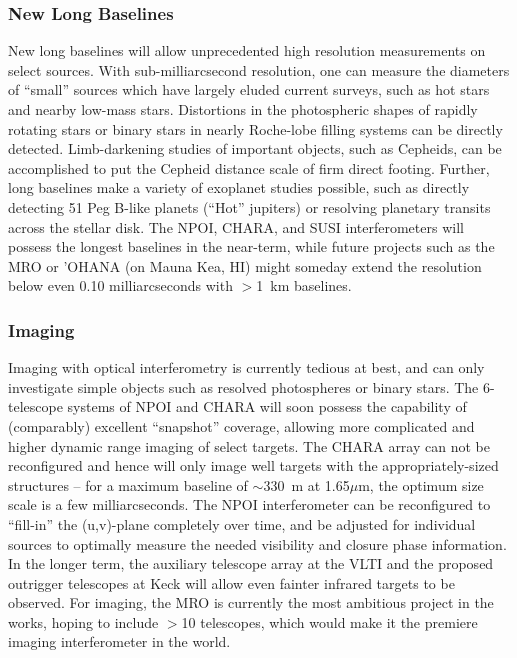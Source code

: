 \documentclass[12pt]{article}
\begin{document}
\subsubsection{New Long Baselines}
New long baselines will allow unprecedented high resolution
measurements on select sources.  With sub-milliarcsecond resolution,
one can measure the diameters of ``small'' sources which have largely
eluded current surveys, such as hot stars and nearby low-mass stars.
Distortions in the photospheric shapes of rapidly rotating stars or
binary stars in nearly Roche-lobe filling systems can be directly
detected.  Limb-darkening studies of important objects, such as
Cepheids, can be accomplished to put the Cepheid distance scale of
firm direct footing.  Further, long baselines make a variety of
exoplanet studies possible, such as directly detecting 51 Peg B-like
planets (``Hot'' jupiters) or resolving planetary transits across the
stellar disk.  The NPOI, CHARA, and SUSI interferometers will possess
the longest baselines in the near-term, while future projects such as
the MRO or 'OHANA (on Mauna Kea, HI) might
someday extend the resolution below even 0.10 milliarcseconds with
$>$1~km baselines.

\subsubsection{Imaging}
Imaging with optical interferometry is currently tedious at best, and
can only investigate simple objects such as resolved photospheres or
binary stars.  The 6-telescope systems of NPOI and CHARA will soon
possess the capability of (comparably) excellent ``snapshot''
coverage, allowing more complicated and higher dynamic range imaging
of select targets.  The CHARA array can not be reconfigured and hence
will only image well targets with the appropriately-sized structures
-- for a maximum baseline of $\sim$330~m at 1.65$\mu$m, the optimum
size scale is a few milliarcseconds.  The NPOI interferometer can be
reconfigured to ``fill-in'' the (u,v)-plane completely over time, and
be adjusted for individual sources to optimally measure the needed
visibility and closure phase information.  In the longer term, the
auxiliary telescope array at the VLTI and the proposed outrigger
telescopes at Keck will allow even fainter infrared targets to be
observed.  For imaging, the MRO is currently the most ambitious
project in the works, hoping to include $>$10 telescopes, which would
make it the premiere imaging interferometer in the world.
\end{document}

